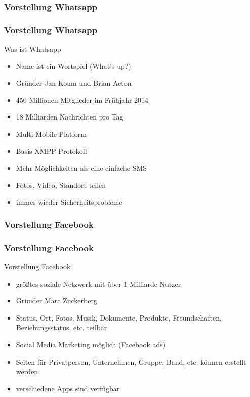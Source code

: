 \documentclass[xcolor=dvipsnames]{beamer}
\begin{document}
\subsubsection{Vorstellung Whatsapp}
\begin{frame} %
  \frametitle{Vorstellung Whatsapp} %
  \begin{block}{Was ist Whatsapp}
	  \begin{itemize}
	  	\item Name ist ein Wortspiel (What's up?)
		\item Gründer Jan Koum und Brian Acton
		\item 450 Millionen Mitglieder im Frühjahr 2014
		\item 18 Milliarden Nachrichten pro Tag
		\item Multi Mobile Platform
		\item Basis XMPP Protokoll
		\item Mehr Möglichkeiten als eine einfache SMS
		\item Fotos, Video, Standort teilen
		\item immer wieder Sicherheitsprobleme
	  \end{itemize}
  \end{block}
\end{frame}


\subsubsection{Vorstellung Facebook}
\begin{frame} %
  \frametitle{Vorstellung Facebook} %
  \begin{block}{Vorstellung Facebook}
	  \begin{itemize}
	  	\item größtes soziale Netzwerk mit über 1 Milliarde Nutzer
		\item Gründer Marc Zuckerberg
		\item Status, Ort, Fotos, Musik, Dokumente, Produkte, Freundschaften, Beziehungsstatus, etc. teilbar
		\item Social Media Marketing möglich (Facebook ads)
		\item Seiten für Privatperson, Unternehmen, Gruppe, Band, etc. können erstellt werden
		\item verschiedene Apps sind verfügbar
	  \end{itemize}
  \end{block}
\end{frame}
\end{document}
